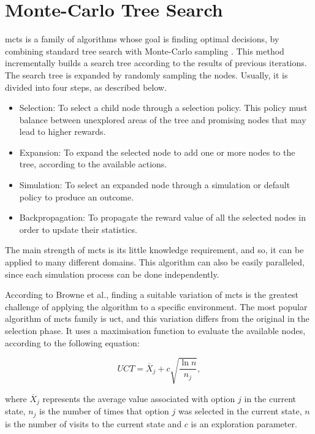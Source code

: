 \section{Monte-Carlo Tree Search}


\ac{mcts} is a family of algorithms whose goal is finding optimal decisions, by combining standard tree search with Monte-Carlo sampling \cite{Browne2012}.
This method incrementally builds a search tree according to the results of previous iterations.
The search tree is expanded by randomly sampling the nodes.
Usually, it is divided into four steps, as described below.
\begin{itemize}
  \item Selection: To select a child node through a selection policy. This policy must balance between unexplored areas of the tree and promising nodes that may lead to higher rewards.
  \item Expansion: To expand the selected node to add one or more nodes to the tree, according to the available actions.
  \item Simulation: To select an expanded node through a simulation or default policy to produce an outcome.
  \item Backpropagation: To propagate the reward value of all the selected nodes in order to update their statistics.
\end{itemize}


The main strength of \ac{mcts} is its little knowledge requirement, and so, it can be applied to many different domains.
This algorithm can also be easily paralleled, since each simulation process can be done independently.


According to Browne et al., finding a suitable variation of \ac{mcts} is the greatest challenge of applying the algorithm to a specific environment.
The most popular algorithm of \ac{mcts} family is \ac{uct}, and this variation differs from the original in the selection phase.
It uses a maximisation function to evaluate the available nodes, according to the following equation:

\begin{equation}
    UCT = \overline{X}_j + c\sqrt{\frac{\ln n}{n_j}},
\end{equation}

where $\overline{X}_j$ represents the average value associated with option $j$ in the current state, $n_j$ is the number of times that option $j$ was selected in the current state, $n$ is the number of visits to the current state and $c$ is an exploration parameter.

